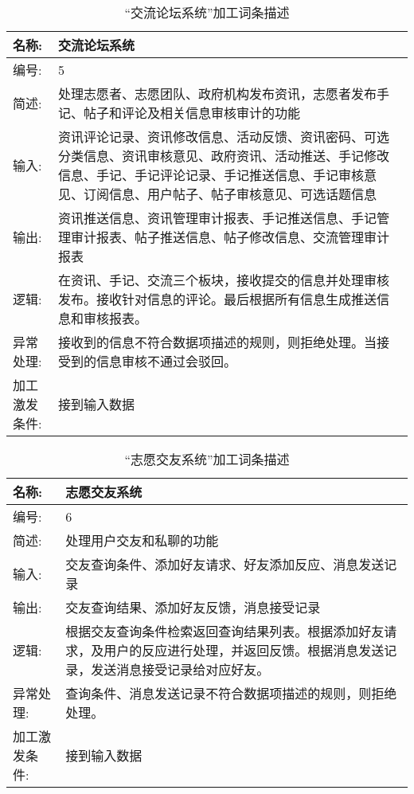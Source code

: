 \begin{table}[H]  
\caption{“交流论坛系统”加工词条描述}  
\begin{center}  
    \begin{tabular}{l p{11cm}} 
        \hline
        \quad 名称:  &   交流论坛系统 \\
        \hline
        \quad 编号:  & 5 \\
        \hline
        \quad 简述:  & 处理志愿者、志愿团队、政府机构发布资讯，志愿者发布手记、帖子和评论及相关信息审核审计的功能 \\
        \hline
        \quad 输入:  & 资讯评论记录、资讯修改信息、活动反馈、资讯密码、可选分类信息、资讯审核意见、政府资讯、活动推送、手记修改信息、手记、手记评论记录、手记推送信息、手记审核意见、订阅信息、用户帖子、帖子审核意见、可选话题信息 \\
        \hline
        \quad 输出:  & 资讯推送信息、资讯管理审计报表、手记推送信息、手记管理审计报表、帖子推送信息、帖子修改信息、交流管理审计报表 \\
        \hline
        \quad 逻辑:  & 在资讯、手记、交流三个板块，接收提交的信息并处理审核发布。接收针对信息的评论。最后根据所有信息生成推送信息和审核报表。 \\
        \hline
        \quad 异常处理: & 接收到的信息不符合数据项描述的规则，则拒绝处理。当接受到的信息审核不通过会驳回。\\ 
        \hline
        \quad 加工激发条件: & 接到输入数据 \\ 
        \hline
    \end{tabular}
    \label{tab1}
\end{center}
\end{table}

\begin{table}[H]  
\caption{“志愿交友系统”加工词条描述}  
\begin{center}  
    \begin{tabular}{l p{11cm}} 
        \hline
        \quad 名称:  &   志愿交友系统 \\
        \hline
        \quad 编号:  & 6 \\
        \hline
        \quad 简述:  & 处理用户交友和私聊的功能  \\
        \hline
        \quad 输入:  & 交友查询条件、添加好友请求、好友添加反应、消息发送记录 \\
        \hline
        \quad 输出:  & 交友查询结果、添加好友反馈，消息接受记录 \\
        \hline
        \quad 逻辑:  & 根据交友查询条件检索返回查询结果列表。根据添加好友请求，及用户的反应进行处理，并返回反馈。根据消息发送记录，发送消息接受记录给对应好友。 \\
        \hline
        \quad 异常处理: & 查询条件、消息发送记录不符合数据项描述的规则，则拒绝处理。\\ 
        \hline
        \quad 加工激发条件: & 接到输入数据 \\ 
        \hline
    \end{tabular}
    \label{tab1}
\end{center}
\end{table}



